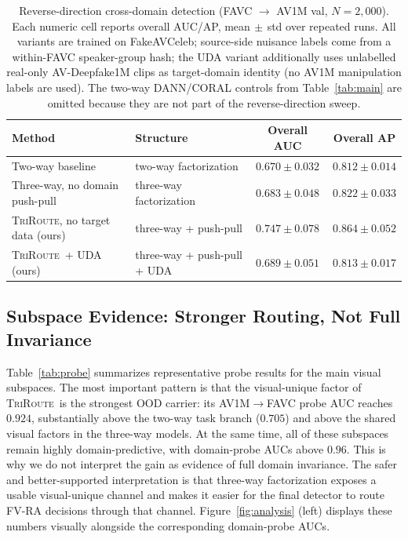 \documentclass{article}
\newcommand{\method}{\textsc{TriRoute}}
\begin{document}
\begin{table}[t]
    \centering
    \caption{Reverse-direction cross-domain detection (FAVC $\to$ AV1M val, $N=2{,}000$). Each numeric cell reports overall AUC/AP, mean$\,\pm\,$std over repeated runs. All variants are trained on FakeAVCeleb; source-side nuisance labels come from a within-FAVC speaker-group hash; the UDA variant additionally uses unlabelled real-only AV-Deepfake1M clips as target-domain identity (no AV1M manipulation labels are used). The two-way DANN/CORAL controls from Table~\ref{tab:main} are omitted because they are not part of the reverse-direction sweep.}
    \label{tab:reverse}
    \small
    \begin{tabular}{llcc}
        \toprule
        Method & Structure & Overall AUC & Overall AP \\
        \midrule
        Two-way baseline                 & two-way factorization        & $0.670 \pm 0.032$ & $0.812 \pm 0.014$ \\
        Three-way, no domain push-pull   & three-way factorization      & $0.683 \pm 0.048$ & $0.822 \pm 0.033$ \\
        \method, no target data (ours)   & three-way + push-pull        & $\mathbf{0.747 \pm 0.078}$ & $\mathbf{0.864 \pm 0.052}$ \\
        \method\ + UDA (ours)            & three-way + push-pull + UDA  & $0.689 \pm 0.051$ & $0.813 \pm 0.017$ \\
        \bottomrule
    \end{tabular}
\end{table}

\subsection{Subspace Evidence: Stronger Routing, Not Full Invariance}

Table~\ref{tab:probe} summarizes representative probe results for the main visual subspaces. The most important pattern is that the visual-unique factor of \method\ is the strongest OOD carrier: its AV1M$\rightarrow$FAVC probe AUC reaches $0.924$, substantially above the two-way task branch ($0.705$) and above the shared visual factors in the three-way models. At the same time, all of these subspaces remain highly domain-predictive, with domain-probe AUCs above $0.96$. This is why we do not interpret the gain as evidence of full domain invariance. The safer and better-supported interpretation is that three-way factorization exposes a usable visual-unique channel and makes it easier for the final detector to route FV-RA decisions through that channel. Figure~\ref{fig:analysis} (left) displays these numbers visually alongside the corresponding domain-probe AUCs.
\end{document}
